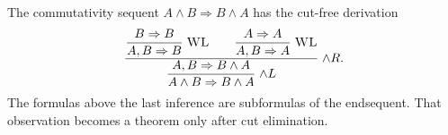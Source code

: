 \begin{example}
The commutativity sequent \(A\land B\Rightarrow B\land A\) has the cut-free
derivation
\[
\frac{
  \dfrac{B\Rightarrow B}{A,B\Rightarrow B}\;\textsc{WL}
  \qquad
  \dfrac{A\Rightarrow A}{A,B\Rightarrow A}\;\textsc{WL}
}{
  \dfrac{A,B\Rightarrow B\land A}{A\land B\Rightarrow B\land A}
  \;\textsc{\(\land L\)}
}\;\textsc{\(\land R\)}.
\]
The formulas above the last inference are subformulas of the endsequent.  That
observation becomes a theorem only after cut elimination.
\end{example}

